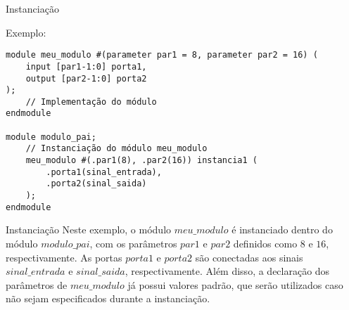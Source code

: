 \documentclass[aspectratio=169,xcolor=dvipsnames]{beamer}
\begin{document}
\begin{frame}[fragile]{Instanciação}
        \begin{block}{Exemplo:}
        \begin{verbatim}
module meu_modulo #(parameter par1 = 8, parameter par2 = 16) (
    input [par1-1:0] porta1,
    output [par2-1:0] porta2
);
    // Implementação do módulo
endmodule

module modulo_pai;
    // Instanciação do módulo meu_modulo
    meu_modulo #(.par1(8), .par2(16)) instancia1 (
        .porta1(sinal_entrada),
        .porta2(sinal_saida)
    );
endmodule
        \end{verbatim}
    \end{block}
\end{frame}

\begin{frame}{Instanciação}
    Neste exemplo, o módulo $meu\_modulo$ é instanciado dentro do módulo $modulo\_pai$, com os parâmetros $par1$ e $par2$ definidos como $8$ e $16$, respectivamente. As portas $porta1$ e $porta2$ são conectadas aos sinais $sinal\_entrada$ e $sinal\_saida$, respectivamente. Além disso, a declaração dos parâmetros de $meu\_modulo$ já possui valores padrão, que serão utilizados caso não sejam especificados durante a instanciação.
\end{frame}
\end{document}
